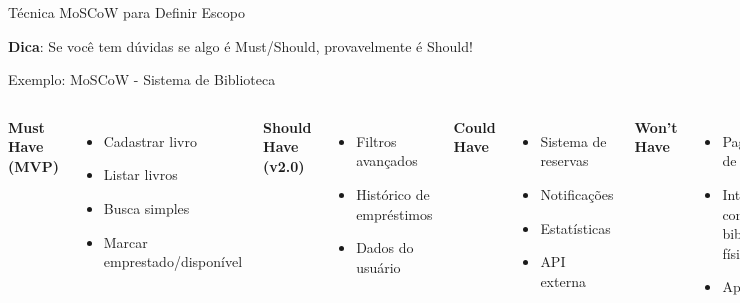 \documentclass[10pt]{beamer}
\begin{document}
\begin{frame}{Técnica MoSCoW para Definir Escopo}
\centering
{}

\vspace{0.5cm}
\textbf{Dica}: Se você tem dúvidas se algo é Must/Should, provavelmente é Should!
\end{frame}

\begin{frame}{Exemplo: MoSCoW - Sistema de Biblioteca}
\begin{columns}[t]
\textbf{Must Have (MVP)}
\begin{itemize}
    \item Cadastrar livro
    \item Listar livros
    \item Busca simples
    \item Marcar emprestado/disponível
\end{itemize}

\textbf{Should Have (v2.0)}
\begin{itemize}
    \item Filtros avançados
    \item Histórico de empréstimos
    \item Dados do usuário
\end{itemize}

\textbf{Could Have}
\begin{itemize}
    \item Sistema de reservas
    \item Notificações
    \item Estatísticas
    \item API externa
\end{itemize}

\textbf{Won't Have}
\begin{itemize}
    \item Pagamentos de multa
    \item Integração com biblioteca física
    \item App mobile
\end{itemize}
\end{columns}
\end{frame}
\end{document}
